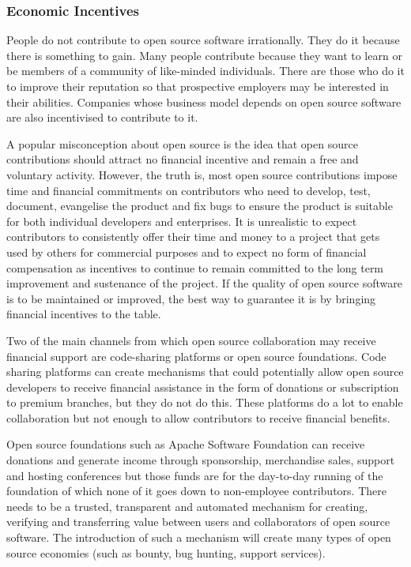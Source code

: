\subsubsection{Economic Incentives}
People do not contribute to open source software irrationally. They do it because there is something to gain. Many people contribute because they want to learn or be members of a community of like-minded individuals. There are those who do it to improve their reputation so that prospective employers may be interested in their abilities. Companies whose business model depends on open source software are also incentivised to contribute to it.

A popular misconception about open source is the idea that open source contributions should attract no financial incentive and remain a free and voluntary activity. However, the truth is, most open source contributions impose time and financial commitments on contributors who need to develop, test, document, evangelise the product and fix bugs to ensure the product is suitable for both individual developers and enterprises. It is unrealistic to expect contributors to consistently offer their time and money to a project that gets used by others for commercial purposes and to expect no form of financial compensation as incentives to continue to remain committed to the long term improvement and sustenance of the project. If the quality of open source software is to be maintained or improved, the best way to guarantee it is by bringing financial incentives to the table.

Two of the main channels from which open source collaboration may receive financial support are code-sharing platforms or open source foundations. Code sharing platforms can create mechanisms that could potentially allow open source developers to receive financial assistance in the form of donations or subscription to premium branches, but they do not do this. These platforms do a lot to enable collaboration but not enough to allow contributors to receive financial benefits.

Open source foundations such as Apache Software Foundation can receive donations and generate income through sponsorship, merchandise sales, support and hosting conferences but those funds are for the day-to-day running of the foundation of which none of it goes down to non-employee contributors. There needs to be a trusted, transparent and automated mechanism for creating, verifying and transferring value between users and collaborators of open source software. The introduction of such a mechanism will create many types of open source economies (such as bounty, bug hunting, support services).

